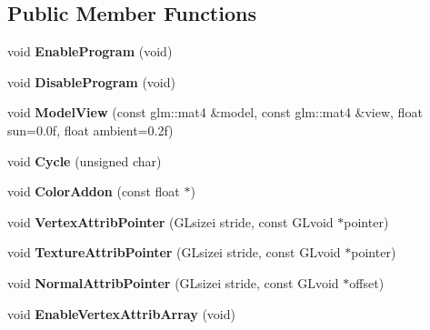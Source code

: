 \subsection*{\-Public \-Member \-Functions}
\begin{DoxyCompactItemize}
\item 
\hypertarget{classMonsterShader_a92637d67904524b2eadbb41d1e87518c}{void {\bfseries \-Enable\-Program} (void)}\label{classMonsterShader_a92637d67904524b2eadbb41d1e87518c}

\item 
\hypertarget{classMonsterShader_aa1a87c344a6bfbb4916b48e36f9923a9}{void {\bfseries \-Disable\-Program} (void)}\label{classMonsterShader_aa1a87c344a6bfbb4916b48e36f9923a9}

\item 
\hypertarget{classMonsterShader_ae5d0a0a4685f9adcec0b7026318610da}{void {\bfseries \-Model\-View} (const glm\-::mat4 \&model, const glm\-::mat4 \&view, float sun=0.\-0f, float ambient=0.\-2f)}\label{classMonsterShader_ae5d0a0a4685f9adcec0b7026318610da}

\item 
\hypertarget{classMonsterShader_aed594a6af120ccdcbf1e0343f57a56b7}{void {\bfseries \-Cycle} (unsigned char)}\label{classMonsterShader_aed594a6af120ccdcbf1e0343f57a56b7}

\item 
\hypertarget{classMonsterShader_ae2f1915756ba9070486218d48642fcec}{void {\bfseries \-Color\-Addon} (const float $\ast$)}\label{classMonsterShader_ae2f1915756ba9070486218d48642fcec}

\item 
\hypertarget{classMonsterShader_acc362d2fc6d941fd2c8d5510e8d6abee}{void {\bfseries \-Vertex\-Attrib\-Pointer} (\-G\-Lsizei stride, const \-G\-Lvoid $\ast$pointer)}\label{classMonsterShader_acc362d2fc6d941fd2c8d5510e8d6abee}

\item 
\hypertarget{classMonsterShader_a25dd31c9e686e48324f7a3071cd82969}{void {\bfseries \-Texture\-Attrib\-Pointer} (\-G\-Lsizei stride, const \-G\-Lvoid $\ast$pointer)}\label{classMonsterShader_a25dd31c9e686e48324f7a3071cd82969}

\item 
\hypertarget{classMonsterShader_ad2a46c81c37460aeeab1535253653237}{void {\bfseries \-Normal\-Attrib\-Pointer} (\-G\-Lsizei stride, const \-G\-Lvoid $\ast$offset)}\label{classMonsterShader_ad2a46c81c37460aeeab1535253653237}

\item 
\hypertarget{classMonsterShader_a69ea6ceed592808c3548826c824d3203}{void {\bfseries \-Enable\-Vertex\-Attrib\-Array} (void)}\label{classMonsterShader_a69ea6ceed592808c3548826c824d3203}

\end{DoxyCompactItemize}
